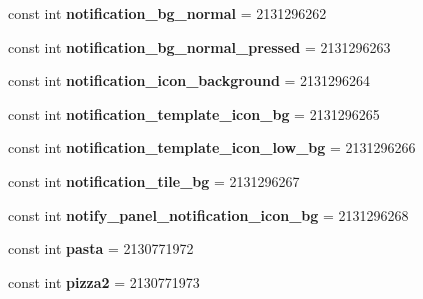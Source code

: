\begin{DoxyCompactItemize}
const int {\bfseries notification\+\_\+bg\+\_\+normal} = 2131296262
\item 
\mbox{\label{classst_delivery_1_1_resource_1_1_drawable_a9f457960c0862d5f07fc7a227cfdac35}} 
const int {\bfseries notification\+\_\+bg\+\_\+normal\+\_\+pressed} = 2131296263
\item 
\mbox{\label{classst_delivery_1_1_resource_1_1_drawable_a0cc34452547c6d921340ed54eef7ea38}} 
const int {\bfseries notification\+\_\+icon\+\_\+background} = 2131296264
\item 
\mbox{\label{classst_delivery_1_1_resource_1_1_drawable_a9f41ee8e3e612c1973d9c91098b7c2c8}} 
const int {\bfseries notification\+\_\+template\+\_\+icon\+\_\+bg} = 2131296265
\item 
\mbox{\label{classst_delivery_1_1_resource_1_1_drawable_af86d3b47098a9fd2120fae25d421d2e0}} 
const int {\bfseries notification\+\_\+template\+\_\+icon\+\_\+low\+\_\+bg} = 2131296266
\item 
\mbox{\label{classst_delivery_1_1_resource_1_1_drawable_a6fbd44b4944131964cfeed04dae6f517}} 
const int {\bfseries notification\+\_\+tile\+\_\+bg} = 2131296267
\item 
\mbox{\label{classst_delivery_1_1_resource_1_1_drawable_a4635eadb7e749cc264e1ba848f83e883}} 
const int {\bfseries notify\+\_\+panel\+\_\+notification\+\_\+icon\+\_\+bg} = 2131296268
\item 
\mbox{\label{classst_delivery_1_1_resource_1_1_drawable_ab997f9098779c69cb2f05877385498d9}} 
const int {\bfseries pasta} = 2130771972
\item 
\mbox{\label{classst_delivery_1_1_resource_1_1_drawable_a56e0a79817537c6159d0717eb860fef9}} 
const int {\bfseries pizza2} = 2130771973
\item 
\mbox{\label{classst_delivery_1_1_resource_1_1_drawable_a316ee8ac8cbc37ea876819f9469caa8a}} 

\end{DoxyCompactItemize}
